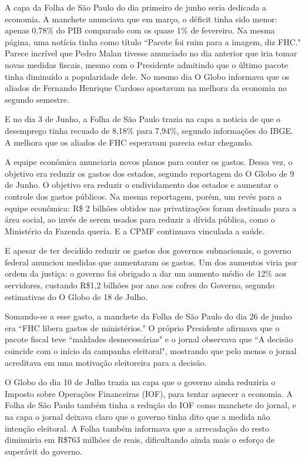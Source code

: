 \documentclass{article}
\begin{document}
A capa da Folha de São Paulo do dia primeiro de junho seria dedicada a economia. A manchete anunciava que em março, o déficit tinha sido menor: apenas 0,78\% do PIB comparado com os quase 1\% de fevereiro. Na mesma página, uma notícia  tinha como título ``Pacote foi ruim para a imagem, diz FHC." Parece incrível que Pedro Malan tivesse anunciado no dia anterior que iria tomar novas medidas fiscais, mesmo com o Presidente admitindo que o último pacote tinha diminuído a popularidade dele. No mesmo dia O Globo informava que os aliados de Fernando Henrique Cardoso apostavam na melhora da economia no segundo semestre. 

E no dia 3 de Junho, a Folha de São Paulo trazia na capa a noticia de que o desemprego tinha recuado de 8,18\% para 7,94\%, segundo informações do IBGE. A melhora que os aliados de FHC esperavam parecia estar chegando.    

A equipe econômica anunciaria novos planos para conter os gastos. Dessa vez, o objetivo era reduzir os gastos dos estados, segundo reportagem do O Globo de 9 de Junho. O objetivo era reduzir o endividamento dos estados e aumentar o controle dos gastos públicos. Na mesma reportagem, porém, um revés para a equipe econômica: R\$ 2 bilhões obtidos nas privatizações foram destinado para a área social, ao invés de serem usados para reduzir a dívida pública, como o Ministério da Fazenda queria. E a CPMF continuava vinculada a saúde.

E apesar de ter decidido reduzir os gastos dos governos subnacionais, o governo federal anunciou medidas que aumentaram os gastos. Um dos aumentos viria por ordem da justiça: o governo foi obrigado a dar um aumento médio de 12\% aos servidores, custando R\$1,2 bilhões por ano aos cofres do Governo, segundo estimativas do O Globo de 18 de Julho. %

Somando-se a esse gasto, a manchete da Folha de São Paulo do dia 26 de junho era ``FHC libera gastos de ministérios." O próprio Presidente afirmava que o pacote fiscal teve ``maldades desnecessárias" e o jornal observava que ``A decisão coincide com o início da campanha eleitoral", mostrando que pelo menos o jornal acreditava em uma motivação eleitoreira para a decisão.  

O Globo do dia 10 de Julho trazia na capa que o governo ainda reduziria o Imposto sobre Operações Financeiras (IOF), para tentar aquecer a economia. A Folha de São Paulo também tinha a redução do IOF como manchete do jornal, e na capa o jornal deixava claro que o governo tinha dito que a medida não intenção eleitoral. A Folha também informava que a arrecadação do resto diminuiria em R\$763 milhões de reais, dificultando ainda mais o esforço de superávit do governo.  
\end{document}
